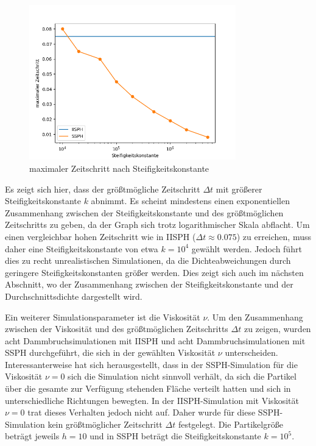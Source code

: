\documentclass[11pt,
a4paper,
parskip=half, %
BCOR=10mm, %
english,
ngerman]{scrreprt}
\begin{document}
\begin{figure}[htb]
    \includegraphics[width=0.8\textwidth]{stiffness_timestep.png}
    \caption{maximaler Zeitschritt nach Steifigkeitskonstante}
    \label{image:stiffness_timestep}
\end{figure}

Es zeigt sich hier, dass der größtmögliche Zeitschritt $\Delta t$ mit größerer Steifigkeitskonstante $k$ abnimmt.
Es scheint mindestens einen exponentiellen Zusammenhang zwischen der Steifigkeitskonstante und des größtmöglichen Zeitschritts zu geben,
da der Graph sich trotz logarithmischer Skala abflacht.
Um einen vergleichbar hohen Zeitschritt wie in IISPH ($\Delta t \approx 0.075$) zu erreichen, muss daher eine Steifigkeitskonstante von etwa $k = 10^4$ gewählt werden.
Jedoch führt dies zu recht unrealistischen Simulationen, da die Dichteabweichungen durch geringere Steifigkeitskonstanten größer werden.
Dies zeigt sich auch im nächsten Abschnitt, wo der Zusammenhang zwischen der Steifigkeitskonstante und der Durchschnittsdichte dargestellt wird.

Ein weiterer Simulationsparameter ist die Viskosität $\nu$.
Um den Zusammenhang zwischen der Viskosität und des größtmöglichen Zeitschritts $\Delta t$ zu zeigen,
wurden acht Dammbruchsimulationen mit IISPH und acht Dammbruchsimulationen mit SSPH durchgeführt, die sich in der gewählten Viskosität $\nu$ unterscheiden.
Interessanterweise hat sich herausgestellt, dass in der SSPH-Simulation für die Viskosität $\nu = 0$ sich die Simulation nicht sinnvoll verhält,
da sich die Partikel über die gesamte zur Verfügung stehenden Fläche verteilt hatten und sich in unterschiedliche Richtungen bewegten.
In der IISPH-Simulation mit Viskosität $\nu = 0$ trat dieses Verhalten jedoch nicht auf.
Daher wurde für diese SSPH-Simulation kein größtmöglicher Zeitschritt $\Delta t$ festgelegt.
Die Partikelgröße beträgt jeweils $h = 10$ und in SSPH beträgt die Steifigkeitskonstante $k = 10^5$.
\end{document}
